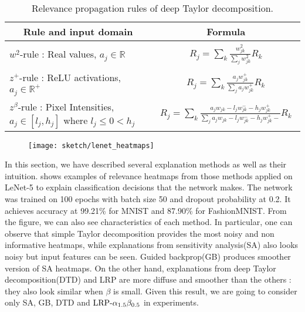 \renewcommand{\arraystretch}{1}
\begin{table}[h]
\centering
\begin{tabular}{|l|l|}
\hline
\multicolumn{1}{|c|}{Rule and input domain} & \multicolumn{1}{c|}{Formula} \\ \hline
$w^2$-rule : Real values,  $a_j \in \mathbb{R}$ & \parbox{1cm}{
	\begin{align*}
		R_j =	\sum_k \frac{ w_{jk}^2  }{\sum_{j} w_{jk}^2}  R_k  	
    \end{align*}}
 \\ \hline
$z^+$-rule : ReLU activations, $a_j \in \mathbb{R}^+$    & \parbox{1cm}{\begin{align*}
R_j = \sum_k  \frac{ a_j  w_{jk}^+   }{\sum_{j}  a_j w_{jk}^+  }  R_k	
\end{align*}} \\ \hline
$z^\beta$-rule : Pixel Intensities, $ a_j \in [l_j , h_j]$ where $l_j \le 0 < h_j $  & \parbox{1cm}{\begin{align*}
R_j = \sum_k  \frac{ a_j  w_{jk} - l_j w_{jk}^- - h_j w_{jk}^+  }{\sum_{j}   a_j  w_{jk} - l_j w_{jk}^- - h_j w_{jk}^+  -}  R_k	
\end{align*}}
               \\ \hline
\end{tabular}
\caption{Relevance propagation rules of deep Taylor decomposition. }
\label{tab:lrp_deep_taylor_rules}
\end{table}
\renewcommand{\arraystretch}{1}


\begin{figure}[!htb]
\centering
\texttt{[image: sketch/lenet\_heatmaps]}
\label{fig:lenet_heatmaps}
\end{figure}

In this section, we have described several explanation methods as well as their intuition.  \addfigure{\ref{fig:lenet_heatmaps}} shows  examples of relevance heatmaps from those methods applied on LeNet-5\cite{LeCunGradientBasedLearningApplied2001} to explain classification decisions that the network makes. The network was trained on 100 epochs with batch size 50 and dropout probability at 0.2. It achieves accuracy at 99.21\% for MNIST and 87.90\% for FashionMNIST. From the figure, we can also see characteristics of each method. In particular, one can observe that simple Taylor decomposition provides the most noisy and non informative heatmaps, while explanations from sensitivity analysis(SA) also looks noisy but input features can be seen. Guided backprop(GB) produces smoother version of SA heatmaps. On the other hand, explanations from deep Taylor decomposition(DTD) and LRP are more diffuse and smoother than the others : they also look similar when $\beta$ is small.  Given this result, we are going to consider only SA, GB, DTD and $\text{LRP-}\alpha_{1.5}\beta_{0.5}$ in experiments.

	